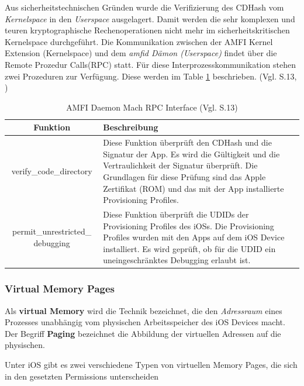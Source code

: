  Aus sicherheitstechnischen Gründen wurde die Verifizierung des CDHash vom \textit{\glqq Kernelspace\grqq{}} in den \textit{\glqq Userspace\grqq{}} ausgelagert. Damit werden die sehr komplexen und teuren kryptographische Rechenoperationen nicht mehr im sicherheitskritischen Kernelspace durchgeführt. Die Kommunikation zwischen der AMFI Kernel Extension (Kernelspace) und dem \textit{\glqq amfid Dämon (Userspace)\grqq{}} findet über die Remote Prozedur Calls(RPC) statt. Für diese Interprozesskommunikation stehen zwei Prozeduren zur Verfügung. Diese werden im Table \ref{tab:AMFID} beschrieben. (Vgl. \cite{iOSSec[5]} S.13, \cite{Mach[1]}) 

\begin{table}[ht]
\begin{center}
\begin{tabular}{|c|p{}|} \hline
  Funktion & Beschreibung\\ \hline
verify\_code\_directory &  
Diese Funktion überprüft den CDHash und die Signatur der App. Es wird die Gültigkeit und die Vertraulichkeit der Signatur überprüft. Die Grundlagen für diese Prüfung sind das Apple Zertifikat (ROM) und das mit der App installierte Provisioning Profiles.\\ \hline

permit\_unrestricted\_ debugging &  
Diese Funktion überprüft die UDIDs der Provisioning Profiles des iOSs. Die Provisioning Profiles wurden mit den Apps auf dem iOS Device installiert. Es wird geprüft, ob für die UDID ein uneingeschränktes Debugging erlaubt ist. \\ \hline
\end{tabular} 
\caption{AMFI Daemon Mach RPC Interface (Vgl. \cite{iOSSec[5]} S.13)}
\label{tab:AMFID}
\end{center}
\end{table}

\subsubsection{Virtual Memory Pages}
\label{sec:virMemoryPages}
 Als \textbf{virtual Memory} wird die Technik bezeichnet, die den \textit{\glqq Adressraum\grqq{}} eines Prozesses unabhängig vom physischen Arbeitsspeicher des iOS Devices macht. Der Begriff \textbf{Paging} bezeichnet die Abbildung der virtuellen Adressen auf die physischen.\par 
Unter iOS gibt es zwei verschiedene Typen von virtuellen Memory Pages, die sich in den gesetzten Permissions unterscheiden 

